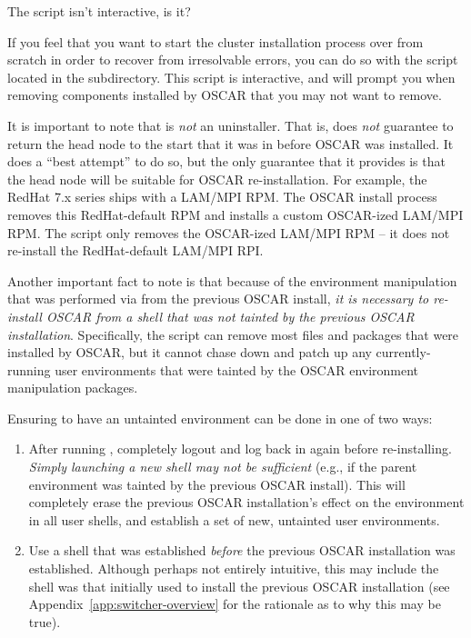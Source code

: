 \begin{discuss}
  The  script isn't interactive, is it?
\end{discuss}

If you feel that you want to start the cluster installation process
over from scratch in order to recover from irresolvable errors, you
can do so with the  script located in the
 subdirectory. This script is interactive, and will
prompt you when removing components installed by OSCAR that you may
not want to remove.

\begchange

It is important to note that  is {\em not} an
uninstaller.  That is,  does {\em not} guarantee to
return the head node to the start that it was in before OSCAR was
installed.  It does a ``best attempt'' to do so, but the only
guarantee that it provides is that the head node will be suitable for
OSCAR re-installation.  For example, the RedHat 7.x series ships with
a LAM/MPI RPM.  The OSCAR install process removes this RedHat-default
RPM and installs a custom OSCAR-ized LAM/MPI RPM.  The
 script only removes the OSCAR-ized LAM/MPI RPM -- it
does not re-install the RedHat-default LAM/MPI RPI.

Another important fact to note is that because of the environment
manipulation that was performed via  from the previous
OSCAR install, {\em it is necessary to re-install OSCAR from a shell
  that was not tainted by the previous OSCAR installation}.
Specifically, the  script can remove most files and
packages that were installed by OSCAR, but it cannot chase down and
patch up any currently-running user environments that were tainted by
the OSCAR environment manipulation packages.

Ensuring to have an untainted environment can be done in one of two
ways:

\begin{enumerate}
\item After running , completely logout and log back
  in again before re-installing.  {\em Simply launching a new shell
    may not be sufficient} (e.g., if the parent environment was
  tainted by the previous OSCAR install).  This will completely erase
  the previous OSCAR installation's effect on the environment in all
  user shells, and establish a set of new, untainted user
  environments.
  
\item Use a shell that was established {\em before} the previous OSCAR
  installation was established.  Although perhaps not entirely
  intuitive, this may include the shell was that initially used to
  install the previous OSCAR installation (see
  Appendix~\ref{app:switcher-overview} for the rationale as to why
  this may be true).
\end{enumerate}

\endchange


